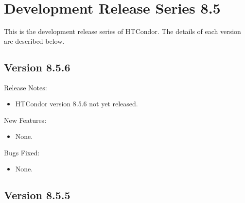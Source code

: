 
\section{\label{sec:History-8-5}Development Release Series 8.5}

This is the development release series of HTCondor.
The details of each version are described below.

\subsection*{\label{sec:New-8-5-6}Version 8.5.6}

\noindent Release Notes:

\begin{itemize}

\item HTCondor version 8.5.6 not yet released.

\end{itemize}


\noindent New Features:

\begin{itemize}

\item None.

\end{itemize}

\noindent Bugs Fixed:

\begin{itemize}

\item None.

\end{itemize}

\subsection*{\label{sec:New-8-5-5}Version 8.5.5}

